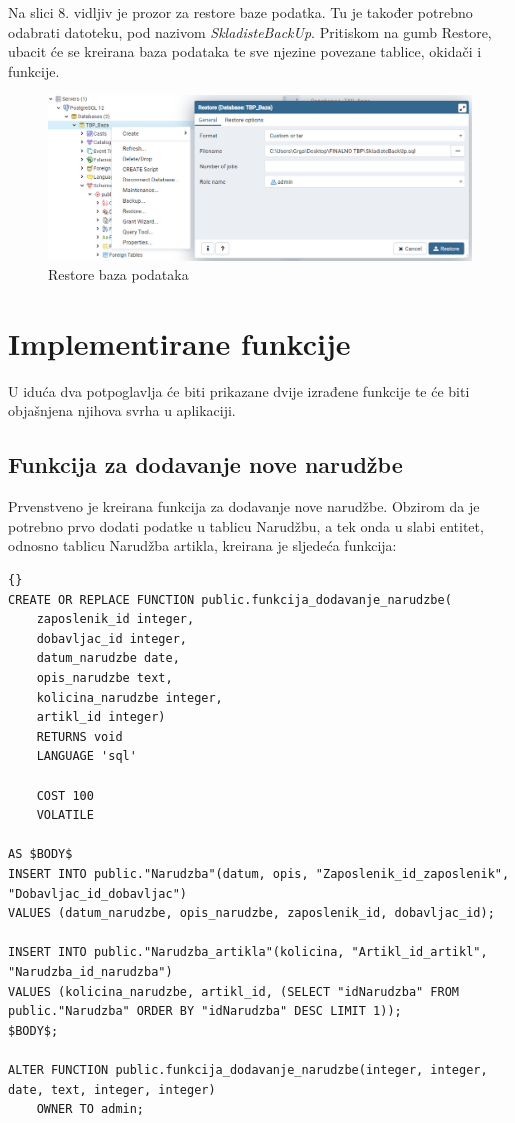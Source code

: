 \documentclass{foi}
\begin{document}
Na slici 8. vidljiv je prozor za restore baze podatka. Tu je također potrebno odabrati datoteku, pod nazivom \emph{SkladisteBackUp}. Pritiskom na gumb Restore, ubacit će se kreirana baza podataka te sve njezine povezane tablice, okidači i funkcije. 

\begin{figure}[h]
    \centering 
    \includegraphics[width=1.1\textwidth]{slike/Restore baze podataka.PNG}
    \caption{Restore baza podataka}
    \label{slika-8}
\end{figure}

\newpage
\section{Implementirane funkcije}
U iduća dva potpoglavlja će biti prikazane dvije izrađene funkcije te će biti objašnjena njihova svrha u aplikaciji.
\subsection{Funkcija za dodavanje nove narudžbe}
Prvenstveno je kreirana funkcija za dodavanje nove narudžbe. Obzirom da je potrebno prvo dodati podatke u tablicu Narudžbu, a tek onda u slabi entitet, odnosno tablicu Narudžba artikla, kreirana je sljedeća funkcija:
\lstset{commentstyle=\textit,language=python}
\begin{lstlisting}[frame=tb]{}
CREATE OR REPLACE FUNCTION public.funkcija_dodavanje_narudzbe(
	zaposlenik_id integer,
	dobavljac_id integer,
	datum_narudzbe date,
	opis_narudzbe text,
	kolicina_narudzbe integer,
	artikl_id integer)
    RETURNS void
    LANGUAGE 'sql'

    COST 100
    VOLATILE 
    
AS $BODY$
INSERT INTO public."Narudzba"(datum, opis, "Zaposlenik_id_zaposlenik", "Dobavljac_id_dobavljac") 
VALUES (datum_narudzbe, opis_narudzbe, zaposlenik_id, dobavljac_id);

INSERT INTO public."Narudzba_artikla"(kolicina, "Artikl_id_artikl", "Narudzba_id_narudzba") 
VALUES (kolicina_narudzbe, artikl_id, (SELECT "idNarudzba" FROM public."Narudzba" ORDER BY "idNarudzba" DESC LIMIT 1));
$BODY$;

ALTER FUNCTION public.funkcija_dodavanje_narudzbe(integer, integer, date, text, integer, integer)
    OWNER TO admin;
\end{lstlisting}
\newpage
\end{document}
